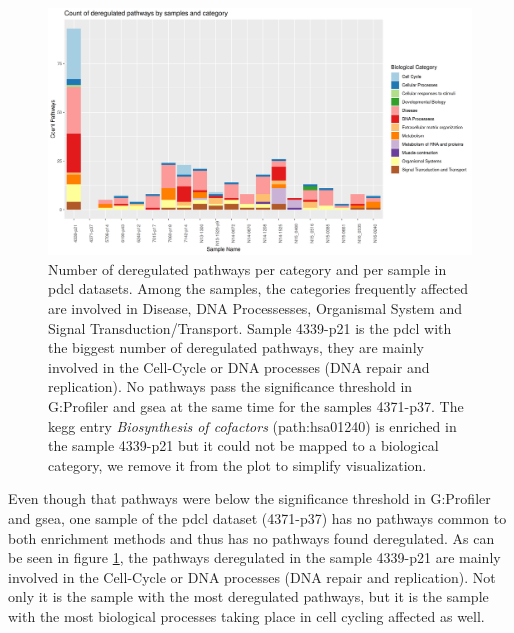 \begin{figure}
    \includegraphics[width=\textwidth]{img/barplot-categ-pdcl}
    \caption{
        Number of deregulated pathways per category and per sample in \acrshort{pdcl} datasets.
        Among the samples, the categories frequently affected are involved in Disease, DNA Processesses, Organismal System and Signal Transduction/Transport.
        Sample 4339-p21 is the \acrshort{pdcl} with the biggest number of deregulated pathways, they are mainly involved in the Cell-Cycle or DNA processes (DNA repair and replication).
        No pathways pass the significance threshold in G:Profiler and \acrshort{gsea} at the same time for the samples 4371-p37.
        The \acrshort{kegg} entry \textit{Biosynthesis of cofactors} (path:hsa01240) is enriched in the sample 4339-p21 but it could not be mapped to a biological category, we remove it from the plot to simplify visualization. 
    }
    \label{fig:barplot-categ-pdcl}
\end{figure}

Even though that pathways were below the significance threshold in G:Profiler and \acrshort{gsea}, one sample of the \acrshort{pdcl} dataset (4371-p37) has no pathways common to both enrichment methods and thus has no pathways found deregulated.
As can be seen in figure \ref*{fig:barplot-categ-pdcl}, the pathways deregulated in the sample 4339-p21 are mainly involved in the Cell-Cycle or DNA processes (DNA repair and replication).
Not only it is the sample with the most deregulated pathways, but it is the sample with the most biological processes taking place in cell cycling affected as well.

